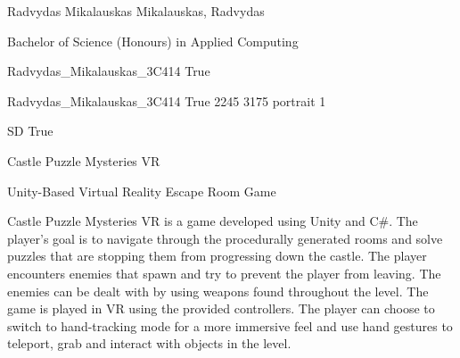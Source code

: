 \documentclass[twoside]{report}
\begin{document}
\begingroup{}\relax



\def\Key{Radvydas_Mikalauskas_3C414}

{Radvydas Mikalauskas}
{Mikalauskas, Radvydas}

{Bachelor of Science (Honours) in Applied Computing}

{Radvydas_Mikalauskas_3C414}
{True}

{Radvydas_Mikalauskas_3C414}
{True}
{2245}
{3175}
{portrait}
{1}

{SD}
{True}

{Castle Puzzle Mysteries VR}

{Unity-Based Virtual Reality Escape Room Game}

{Castle Puzzle Mysteries VR is a game developed using Unity and C\#. The player's goal is to navigate through the procedurally generated rooms and solve puzzles that are stopping them from progressing down the castle. The player encounters enemies that spawn and try to prevent the player from leaving. The enemies can be dealt with by using weapons found throughout the level. The game is played in VR using the provided controllers. The player can choose to switch to hand-tracking mode for a more immersive feel and use hand gestures to teleport, grab and interact with objects in the level.}
\end{document}
